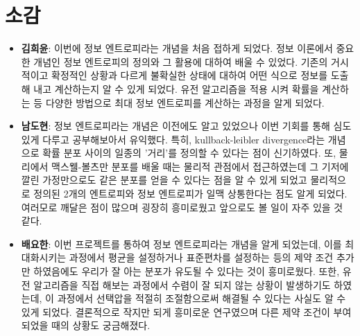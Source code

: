 \section{소감}

\begin{itemize}
    \item[] \textbf{김희윤}: 이번에 정보 엔트로피라는 개념을 처음 접하게 되었다. 정보 이론에서 중요한 개념인 정보 엔트로피의 정의와 그 활용에 대하여 배울 수 있었다. 기존의 거시적이고 확정적인 상황과 다르게 불확실한 상태에 대하여 어떤 식으로 정보를 도출해 내고 계산하는지 알 수 있게 되었다. 유전 알고리즘을 적용 시켜 확률을 계산하는 등 다양한 방법으로 최대 정보 엔트로피를 계산하는 과정을 알게 되었다.
    
    
    \item[] \textbf{남도현}: 정보 엔트로피라는 개념은 이전에도 알고 있었으나 이번 기회를 통해 심도있게 다루고 공부해보아서 유익했다. 특히, kullback-leibler divergence라는 개념으로 확률 분포 사이의 일종의 '거리'를 정의할 수 있다는 점이 신기하였다. 또, 물리에서 맥스웰-볼츠만 분포를 배울 때는 물리적 관점에서 접근하였는데 그 기저에 깔린 가정만으로도 같은 분포를 얻을 수 있다는 점을 알 수 있게 되었고 물리적으로 정의된 2개의 엔트로피와 정보 엔트로피가 일맥 상통한다는 점도 알게 되었다. 여러모로 깨달은 점이 많으며 굉장히 흥미로웠고 앞으로도 볼 일이 자주 있을 것 같다.
    
    \item[] \textbf{배요한}: 이번 프로젝트를 통하여 정보 엔트로피라는 개념을 알게 되었는데, 이를 최대화시키는 과정에서 평균을 설정하거나 표준편차를 설정하는 등의 제약 조건 추가만 하였음에도 우리가 잘 아는 분포가 유도될 수 있다는 것이 흥미로웠다. 또한, 유전 알고리즘을 직접 해보는 과정에서 수렴이 잘 되지 않는 상황이 발생하기도 하였는데, 이 과정에서 선택압을 적절히 조절함으로써 해결될 수 있다는 사실도 알 수 있게 되었다. 결론적으로 작지만 되게 흥미로운 연구였으며 다른 제약 조건이 부여되었을 때의 상황도 궁금해졌다.
    
    
\end{itemize}